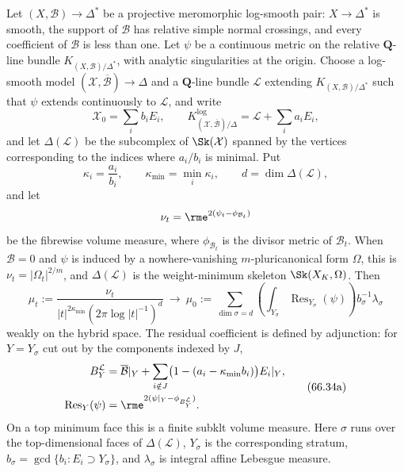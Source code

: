 \begin{theorem}\label{thm:hybrid-volume-forms}
Let $(X,\mathcal B)\to\Delta^*$ be a projective meromorphic log-smooth pair: $X\to\Delta^*$ is smooth, the support of $\mathcal B$ has relative simple normal crossings, and every coefficient of $\mathcal B$ is less than one.  Let $\psi$ be a continuous metric on the relative $\mathbf Q$-line bundle $K_{(X,\mathcal B)/\Delta^*}$, with analytic singularities at the origin.  Choose a log-smooth model $(\mathcal X,\overline{\mathcal B})\to\Delta$ and a $\mathbf Q$-line bundle $\mathcal L$ extending $K_{(X,\mathcal B)/\Delta^*}$ such that $\psi$ extends continuously to $\mathcal L$, and write
\[
 \mathcal X_0=\sum_i b_iE_i,\qquad
 K^{\log}_{(\mathcal X,\overline{\mathcal B})/\Delta}
       =\mathcal L+\sum_i a_iE_i,
\]
and let $\Delta(\mathcal L)$ be the subcomplex of $\Sk(\mathcal X)$ spanned by the vertices corresponding to the indices where $a_i/b_i$ is minimal.  Put
\[
 \kappa_i=\frac{a_i}{b_i},\qquad
 \kappa_{\min}=\min_i\kappa_i,\qquad
 d=\dim\Delta(\mathcal L),
\]
and let
\[
 \nu_t=\rme^{2(\psi_t-\phi_{\mathcal B_t})}
\]
be the fibrewise volume measure, where $\phi_{\mathcal B_t}$ is the divisor metric of $\mathcal B_t$.  When $\mathcal B=0$ and $\psi$ is induced by a nowhere-vanishing $m$-pluricanonical form $\Omega$, this is $\nu_t=|\Omega_t|^{2/m}$, and $\Delta(\mathcal L)$ is the weight-minimum skeleton $\Sk(X_K,\Omega)$.  Then
\[
 \mu_t:=
 \frac{\nu_t}
 {|t|^{2\kappa_{\min}}
  (2\pi\log|t|^{-1})^d}
 \ \longrightarrow\
 \mu_0:=
 \sum_{\dim\sigma=d}
 \left(\int_{Y_\sigma}\operatorname{Res}_{Y_\sigma}(\psi)\right)
 b_\sigma^{-1}\lambda_\sigma
\]
weakly on the hybrid space. The residual coefficient is defined by adjunction: for $Y=Y_\sigma$ cut out by the components indexed by $J$,
\[
\begin{aligned}
 B_Y^{\mathcal L}&=\overline{\mathcal B}|_Y+
 \sum_{i\notin J}\bigl(1-(a_i-\kappa_{\min}b_i)\bigr)E_i|_Y,\\
 \operatorname{Res}_Y(\psi)
 &=\rme^{2(\psi|_Y-\phi_{B_Y^{\mathcal L}})}.
\end{aligned}
\tag{66.34a}\label{eq:hybrid-residual-boundary}
\]
On a top minimum face this is a finite subklt volume measure. Here $\sigma$ runs over the top-dimensional faces of $\Delta(\mathcal L)$, $Y_\sigma$ is the corresponding stratum, $b_\sigma=\gcd\{b_i:E_i\supset Y_\sigma\}$, and $\lambda_\sigma$ is integral affine Lebesgue measure.
\end{theorem}


